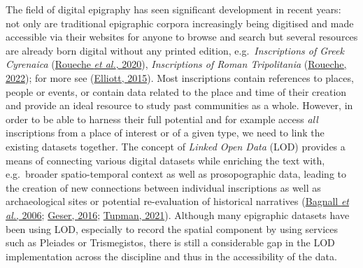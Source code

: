 \documentclass[
  12pt,
]{scrreprt}
\begin{document}
The field of digital epigraphy has seen significant development in
recent years: not only are traditional epigraphic corpora increasingly
being digitised and made accessible via their websites for anyone to
browse and search but several resources are already born digital without
any printed edition, e.g.~\emph{Inscriptions of Greek Cyrenaica}
(\protect\hyperlink{ref-roueche_inscriptions_2020}{Roueche \emph{et
al.}, 2020}), \emph{Inscriptions of Roman Tripolitania}
(\protect\hyperlink{ref-roueche_inscriptions_2022}{Roueche, 2022}); for
more see (\protect\hyperlink{ref-bruun_epigraphy_2015}{Elliott, 2015}).
Most inscriptions contain references to places, people or events, or
contain data related to the place and time of their creation and provide
an ideal resource to study past communities as a whole. However, in
order to be able to harness their full potential and for example access
\emph{all} inscriptions from a place of interest or of a given type, we
need to link the existing datasets together. The concept of \emph{Linked
Open Data} (LOD) provides a means of connecting various digital datasets
while enriching the text with, e.g.~broader spatio-temporal context as
well as prosopographic data, leading to the creation of new connections
between individual inscriptions as well as archaeological sites or
potential re-evaluation of historical narratives
(\protect\hyperlink{ref-bagnall_pleiades_2006}{Bagnall \emph{et al.},
2006}; \protect\hyperlink{ref-geser_wp15_2016}{Geser, 2016};
\protect\hyperlink{ref-tupman_where_2021}{Tupman, 2021}). Although many
epigraphic datasets have been using LOD, especially to record the
spatial component by using services such as Pleiades or Trismegistos,
there is still a considerable gap in the LOD implementation across the
discipline and thus in the accessibility of the data.
\end{document}
